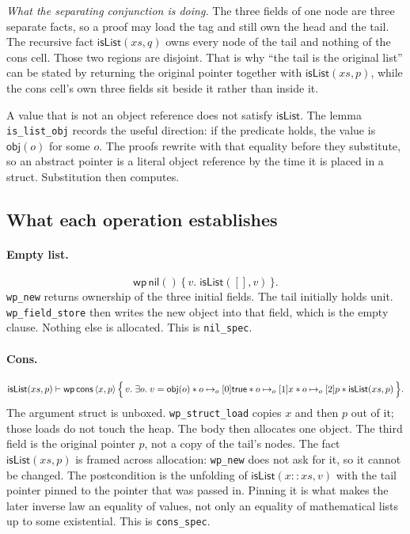 \documentclass[11pt]{article}
\newcommand{\True}{\mathsf{true}}
\newcommand{\ptso}{\mathrel{\mapsto_{o}}}
\newcommand{\sep}{\mathbin{*}}
\newcommand{\Wpre}{\mathsf{wp}}
\begin{document}
\textit{What the separating conjunction is doing.}
The three fields of one node are three separate facts, so a proof may load the tag and still own the head and the tail.
The recursive fact \(\mathsf{isList}(xs, q)\) owns every node of the tail and nothing of the cons cell.
Those two regions are disjoint.
That is why ``the tail is the original list'' can be stated by returning the original pointer together with \(\mathsf{isList}(xs, p)\), while the cons cell's own three fields sit beside it rather than inside it.

A value that is not an object reference does not satisfy \(\mathsf{isList}\).
The lemma \texttt{is\_list\_obj} records the useful direction: if the predicate holds, the value is \(\mathsf{obj}(o)\) for some \(o\).
The proofs rewrite with that equality before they substitute, so an abstract pointer is a literal object reference by the time it is placed in a struct.
Substitution then computes.

\subsection{What each operation establishes}

\paragraph{Empty list.}
\[
\Wpre\,\mathsf{nil}()\,\{\,v.\; \mathsf{isList}([], v)\,\}.
\]
\texttt{wp\_new} returns ownership of the three initial fields. The tail initially holds unit.
\texttt{wp\_field\_store} then writes the new object into that field, which is the empty clause.
Nothing else is allocated.
This is \texttt{nil\_spec}.

\paragraph{Cons.}
\[
\mathsf{isList}(xs, p)
\vdash
\Wpre\,\mathsf{cons}\,\langle x, p\rangle
\,\Bigl\{\,v.\;
  \exists o.\;
  v = \mathsf{obj}(o)
  \sep
  o \ptso[0] \True
  \sep
  o \ptso[1] x
  \sep
  o \ptso[2] p
  \sep
  \mathsf{isList}(xs, p)
\,\Bigr\}.
\]
The argument struct is unboxed.
\texttt{wp\_struct\_load} copies \(x\) and then \(p\) out of it; those loads do not touch the heap.
The body then allocates one object.
The third field is the original pointer \(p\), not a copy of the tail's nodes.
The fact \(\mathsf{isList}(xs, p)\) is framed across allocation: \texttt{wp\_new} does not ask for it, so it cannot be changed.
The postcondition is the unfolding of \(\mathsf{isList}(x :: xs, v)\) with the tail pointer pinned to the pointer that was passed in.
Pinning it is what makes the later inverse law an equality of values, not only an equality of mathematical lists up to some existential.
This is \texttt{cons\_spec}.
\end{document}
